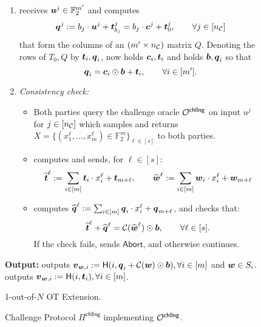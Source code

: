 \begin{figure}[t]
{\begin{minipage}{0.95\linewidth}
\begin{enumerate}
				\item \send receives $\boldsymbol{u}^j\in\mathbb{F}^{m'}_2$ and computes
				$$
					\boldsymbol{q}^j := b_j \cdot \boldsymbol{u}^j +\boldsymbol{t}^j_{b_j} = b_j\cdot \boldsymbol{c}^j+\boldsymbol{t}^j_0,\qquad \forall j\in[{n_\mathcal{C}}]
				$$
				that form the columns of an $(m'\times {n_\mathcal{C}})$ matrix $Q$. Denoting the rows of $T_0, Q$ by $\boldsymbol{t}_i,\boldsymbol{q}_i$, \rec now holds $\boldsymbol{c}_i,\boldsymbol{t}_i$ and \send holds $\boldsymbol{b}, \boldsymbol{q}_i$ so that 
				$$
					\boldsymbol{q}_i = \boldsymbol{c}_i\odot \boldsymbol{b}+\boldsymbol{t}_i,\qquad \forall i\in[m'].
				$$
				
				\item \emph{Consistency check:}\label{step:consistency}
				\begin{itemize}
					\item Both parties query the challenge oracle $\mathcal{O}^{\textsf{chllng}}$ on input $u^j$ for $j\in[{n_\mathcal{C}}]$  which samples and returns $X=\{(x_1^{\ell}, ...,x_m^{\ell} )\in \mathbb{F}^m_2\}_{\ell\in[s]}$ %
					to both parties.
					
					\item \rec computes and sends, for $\ell \in[s]$:
					$$
						\widehat {\boldsymbol{t}}^{\ell} := \sum_{i\in[m]} \boldsymbol{t}_i \cdot x_i^\ell + \boldsymbol{t}_{m+\ell}, \qquad \widehat {\boldsymbol{w}}^\ell := \sum_{i\in[m]} \boldsymbol{w}_i \cdot x_i^\ell + \boldsymbol{w}_{m+\ell}
					$$
					
					\item \send computes $\widehat {\boldsymbol{q}}^\ell := \sum_{i\in[m]} \boldsymbol{q}_i \cdot x^\ell_i + \boldsymbol{q}_{m+\ell}$, and checks that:
					$$
						\widehat{\boldsymbol{t}}^\ell + \widehat{\boldsymbol{q}}^\ell = \mathcal{C}(\widehat{\boldsymbol{w}}^\ell) \odot \boldsymbol{b}, \qquad \forall\ell\in[s].
					$$
					If the check fails, \send sends $\textsf{Abort}$, and otherwise continues.
				\end{itemize}
			\end{enumerate}
		
		\textbf{Output:} \send outputs $\boldsymbol{v}_{\boldsymbol{w},i}:=\mathsf{H}(i,\boldsymbol{q}_i+\mathcal{C}(\boldsymbol{w})\odot \boldsymbol{b}), \forall i\in[m]$ and $\boldsymbol{w}\in S_i$. \rec outputs $\boldsymbol{v}_{\boldsymbol{w},i}:= \mathsf{H}(i,\boldsymbol{t}_i), \forall i\in[m]$.
	\end{minipage}}
	\caption{ 1-out-of-$N$ OT Extension.}
	\label{fig:otExt}
\end{figure}


\begin{figure}[t]
	\caption{ Challenge Protocol $\Pi^\textsf{chllng}$ implementing $\mathcal{O}^\textsf{chllng}$.}
	\label{fig:OChallenge}
\end{figure}


